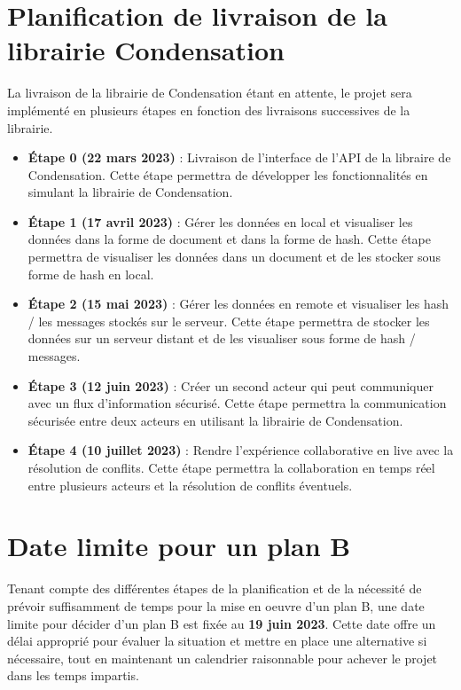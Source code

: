 \section*{Planification de livraison de la librairie Condensation}
La livraison de la librairie de Condensation étant en attente, le projet sera implémenté en plusieurs étapes en fonction des livraisons successives de la librairie.
\begin{itemize}
    \item \textbf{Étape 0 (22 mars 2023)} : Livraison de l'interface de l'API de la libraire de Condensation. Cette étape permettra de développer les fonctionnalités en simulant la librairie de Condensation.
    \item \textbf{Étape 1 (17 avril 2023)} : Gérer les données en local et visualiser les données dans la forme de document et dans la forme de hash. Cette étape permettra de visualiser les données dans un document et de les stocker sous forme de hash en local.
    \item \textbf{Étape 2 (15 mai 2023)} : Gérer les données en remote et visualiser les hash / les messages stockés sur le serveur. Cette étape permettra de stocker les données sur un serveur distant et de les visualiser sous forme de hash / messages.
    \item \textbf{Étape 3 (12 juin 2023)} : Créer un second acteur qui peut communiquer avec un flux d'information sécurisé. Cette étape permettra la communication sécurisée entre deux acteurs en utilisant la librairie de Condensation.
    \item \textbf{Étape 4 (10 juillet 2023)} : Rendre l'expérience collaborative en live avec la résolution de conflits. Cette étape permettra la collaboration en temps réel entre plusieurs acteurs et la résolution de conflits éventuels.
\end{itemize}

\section*{Date limite pour un plan B}
Tenant compte des différentes étapes de la planification et de la nécessité de
prévoir suffisamment de temps pour la mise en oeuvre d'un plan B, une date limite
pour décider d'un plan B est fixée au \textbf{19 juin 2023}. Cette date offre un
délai approprié pour évaluer la situation et mettre en place une alternative si
nécessaire, tout en maintenant un calendrier raisonnable pour achever le projet
dans les temps impartis.


